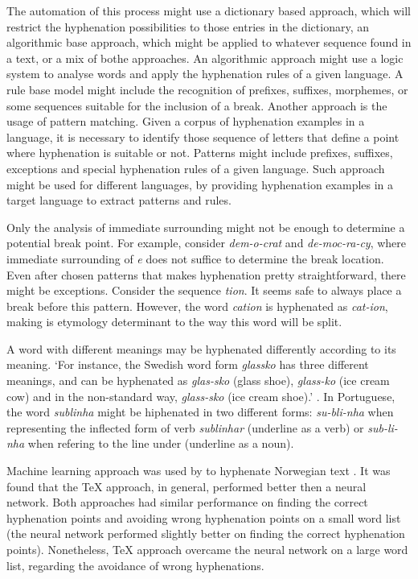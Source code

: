 \documentclass{article}
\begin{document}
The automation of this process might use a dictionary based approach, which
will restrict the hyphenation possibilities to those entries in the dictionary,
an algorithmic base approach, which might be applied to whatever sequence found
in a text, or a mix of bothe approaches. An algorithmic approach might use a
logic system to analyse words and apply the hyphenation rules of a given
language. A rule base model might include the recognition of prefixes,
suffixes, morphemes, or some sequences suitable for the inclusion of a break.
Another approach is the usage of pattern matching. Given a corpus of
hyphenation examples in a language, it is necessary to identify those sequence
of letters that define a point where hyphenation is suitable or not. Patterns
might include prefixes, suffixes, exceptions and special hyphenation rules of a
given language. Such approach might be used for different languages, by
providing hyphenation examples in a target language to extract patterns and
rules.


Only the analysis of immediate surrounding might not be enough to determine a
potential break point. For example, consider \emph{dem-o-crat} and \emph{de-moc-ra-cy},
where immediate surrounding of \emph{e} does not suffice to determine the break
location. Even after chosen patterns that makes hyphenation pretty
straightforward, there might be exceptions. Consider the sequence \emph{tion}. It
seems safe to always place a break before this pattern. However, the word
\emph{cation} is hyphenated as \emph{cat-ion}, making is etymology determinant to the way
this word will be split. 

A word with different meanings may be hyphenated differently according to its
meaning. `For instance, the Swedish word form \emph{glassko} has three different
meanings, and can be hyphenated as \emph{glas-sko} (glass shoe),
\emph{glass-ko} (ice cream cow) and in the non-standard way,
\emph{glass-sko} (ice cream shoe).' \cite{nemeth2006}. In Portuguese, the
word \emph{sublinha} might be hiphenated in two different forms:
\emph{su-bli-nha} when representing the inflected form of verb
\emph{sublinhar} (underline as a verb) or \emph{sub-li-nha} when refering
to the line under (underline as a noun).



Machine learning approach was used by to hyphenate Norwegian text
\cite{kristensen2001}. It was found that the \TeX{} approach, in general,
performed better then a neural network. Both approaches had similar
performance on finding the correct hyphenation points and avoiding wrong
hyphenation points on a small word list (the neural network performed slightly
better on finding the correct hyphenation points). Nonetheless, \TeX{} approach overcame
the neural network on a large word list, regarding the avoidance of wrong
hyphenations.
\end{document}
